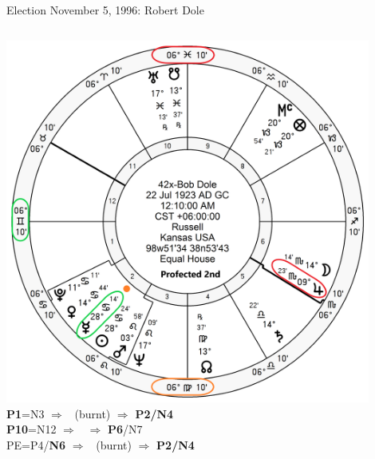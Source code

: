 \begin{frame}[t]{Election November 5, 1996: Robert Dole}
\begin{columns}[T, onlytextwidth]
\vspace{-1em}
{\includegraphics[width=0.9\textwidth]{charts/Dole-Prof-2nd.png}}
\fontsize{8pt}{9pt}\selectfont
\textbf{\dgreen P1}=N3
	$\Rightarrow$ \Mercury\, (burnt) $\Rightarrow$ \textbf{\dgreen P2/N4}\\
\textbf{\red P10}=N12
	$\Rightarrow$ \Jupiter\, $\Rightarrow$ \textbf{\red P6}/N7\\
PE=P4/\textbf{\red N6}
	 $\Rightarrow$ \Mercury\, (burnt) $\Rightarrow$ \textbf{\dgreen P2/N4}

\end{columns}
\end{frame}
